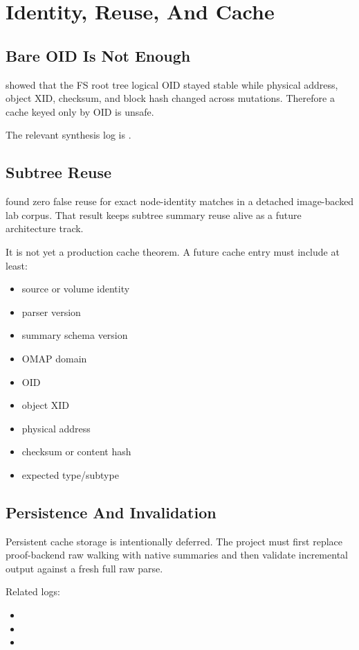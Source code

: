 \chapter{Identity, Reuse, And Cache}

\section{Bare OID Is Not Enough}

 showed that
the FS root tree logical OID stayed stable while physical address, object XID,
checksum, and block hash changed across mutations. Therefore a cache keyed only
by OID is unsafe.

The relevant synthesis log is
.

\section{Subtree Reuse}

 found zero false
reuse for exact node-identity matches in a detached image-backed lab corpus.
That result keeps subtree summary reuse alive as a future architecture track.

It is not yet a production cache theorem. A future cache entry must include at
least:

\begin{itemize}
  \item source or volume identity
  \item parser version
  \item summary schema version
  \item OMAP domain
  \item OID
  \item object XID
  \item physical address
  \item checksum or content hash
  \item expected type/subtype
\end{itemize}

\section{Persistence And Invalidation}

Persistent cache storage is intentionally deferred. The project must first
replace proof-backend raw walking with native summaries and then validate
incremental output against a fresh full raw parse.

Related logs:

\begin{itemize}
  \item {}
  \item {}
  \item {}
\end{itemize}
